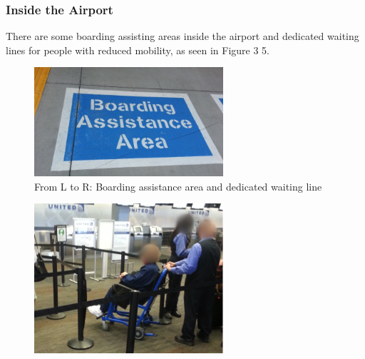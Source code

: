 \documentclass[a4paper, 12pt,conference]{new_cit_thesis}
\begin{document}
\subsubsection{Inside the Airport}
\begin{list}{-}{}
  \item There are some boarding assisting areas inside the airport and dedicated waiting lines for people with reduced mobility, as seen in Figure 3 5.

\begin{figure}[h]
  \centering
     \includegraphics[width=7cm]{images/image032}
   \caption{From L to R: Boarding assistance area and dedicated waiting line}
  \label{fig:32}
\end{figure}
\begin{figure}[h]
  \centering
     \includegraphics[width=7cm]{images/image033}
  \label{fig:33}
\end{figure}


\end{list}
\end{document}
